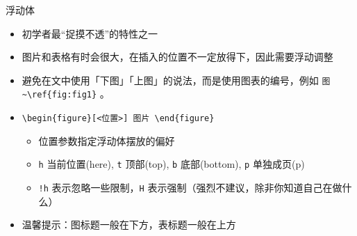 \begin{frame}[fragile]{浮动体}
  \begin{itemize}
    \item 初学者最“捉摸不透”的特性之一
    \item 图片和表格有时会很大，在插入的位置不一定放得下，因此需要浮动调整
    \item 避免在文中使用「下图」「上图」的说法，而是使用图表的编号，例如 \verb|图~\ref{fig:fig1}| 。
    \item \verb|\begin{figure}[<位置>] 图片 \end{figure}|
          \begin{itemize}
            \item 位置参数指定浮动体摆放的偏好
            \item \verb|h| 当前位置(here), \verb|t|
                  顶部(top), \verb|b| 底部(bottom),
                  \verb|p| 单独成页(p)
            \item \verb|!h| 表示忽略一些限制，\verb|H|
                  表示强制\alert{（强烈不建议，除非你知道自己在做什么）}
          \end{itemize}
    \item 温馨提示：图标题一般在下方，表标题一般在上方
  \end{itemize}
\end{frame}

